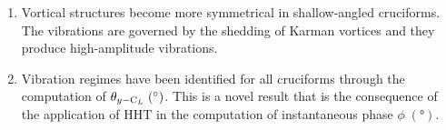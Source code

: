\documentclass[oneside]{utmthesis}
\begin{document}
\begin{enumerate}

  \item Vortical structures become more symmetrical in shallow-angled cruciforms. The vibrations are governed by the shedding of Karman vortices and they produce high-amplitude vibrations.

  \item Vibration regimes have been identified for all cruciforms through the computation of $\plag \; (\si{\degree})$. This is a novel result that is the consequence of the application of HHT in the computation of instantaneous phase $\phi \; (\si{\degree})$.


\end{enumerate}
\end{document}
